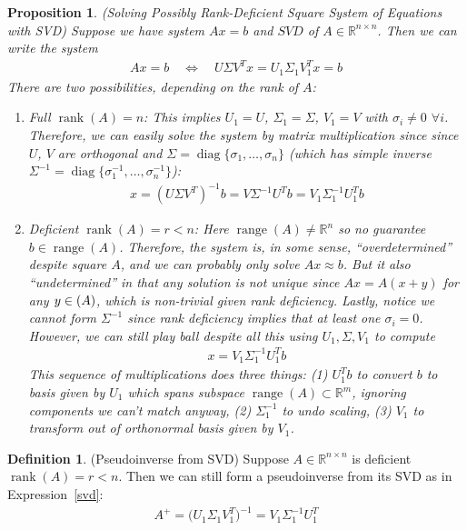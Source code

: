 \documentclass[12pt]{article}
\numberwithin{equation}{section} %
\theoremstyle{plain}
\newtheorem{prop}[thm]{Proposition}
\theoremstyle{definition}
\newtheorem{defn}[thm]{Definition}
\theoremstyle{remark}
\newcommand{\diag}{\operatorname{diag}}
\newcommand{\Rn}{\mathbb{R}^n}
\newcommand{\Rm}{\mathbb{R}^m}
\newcommand{\Rnn}{\mathbb{R}^{n\times n}}
\newcommand{\range}{\operatorname{range}}
\newcommand{\rank}{\operatorname{rank}}
\begin{document}
\begin{prop}
\emph{(Solving Possibly Rank-Deficient Square System of Equations with SVD)}
Suppose we have system $Ax=b$ and $SVD$ of $A\in\Rnn$.
Then we can write the system
\begin{align*}
  Ax = b
  \quad\iff\quad
  U\Sigma V^Tx
  =
  U_1\Sigma_1 V_1^Tx
  = b
\end{align*}
There are two possibilities, depending on the rank of $A$:
\begin{enumerate}
  \item \emph{Full} $\rank(A)=n$: This implies $U_1=U$,
    $\Sigma_1=\Sigma$, $V_1=V$ with $\sigma_i\neq 0$ $\forall i$.
    Therefore, we can easily solve the system by matrix multiplication
    since since $U$, $V$ are orthogonal and
    $\Sigma=\diag\{\sigma_1,\ldots,\sigma_n\}$ (which has simple inverse
    $\Sigma^{-1}=\diag\{\sigma_1^{-1},\ldots,\sigma_n^{-1}\}$):
    \begin{align*}
      x
      = (U\Sigma V^T)^{-1}b
      = V\Sigma^{-1}U^Tb
        = V_1\Sigma_1^{-1}U_1^Tb
    \end{align*}

  \item \emph{Deficient} $\rank(A)=r<n$:
    Here $\range(A)\neq\Rn$ so no guarantee $b\in\range(A)$. Therefore,
    the system is, in some sense, ``overdetermined'' despite square $A$,
    and we can probably only solve $Ax\approx b$.  But it also
    ``undetermined'' in that any solution is not
    unique since $Ax=A(x+y)$ for any $y\in\null(A)$, which is
    non-trivial given rank deficiency.  Lastly, notice we cannot
    form $\Sigma^{-1}$ since rank deficiency implies that at least one
    $\sigma_i=0$.  However, we can still play ball despite all this
    using $U_1, \Sigma, V_1$ to compute
    \begin{align*}
      x = V_1\Sigma_1^{-1}U_1^Tb
    \end{align*}
    This sequence of multiplications does three things:
    (1) $U_1^Tb$ to convert $b$ to basis given by $U_1$ which spans
    subspace $\range(A)\subset \Rm$, ignoring components we can't
    match anyway, (2) $\Sigma_1^{-1}$ to undo scaling, (3) $V_1$ to
    transform out of orthonormal basis given by $V_1$.
\end{enumerate}
\end{prop}

\begin{defn}(Pseudoinverse from SVD)
Suppose $A\in\Rnn$ is deficient $\rank(A)=r<n$. Then we can
still form a pseudoinverse from its SVD as in Expression~\ref{svd}:
\begin{align*}
  A^+ =
  \big(
  U_1\Sigma_1 V^T_1
  \big)^{-1}
  =
  V_1\Sigma_1^{-1}U_1^T
\end{align*}
\end{defn}
\end{document}
